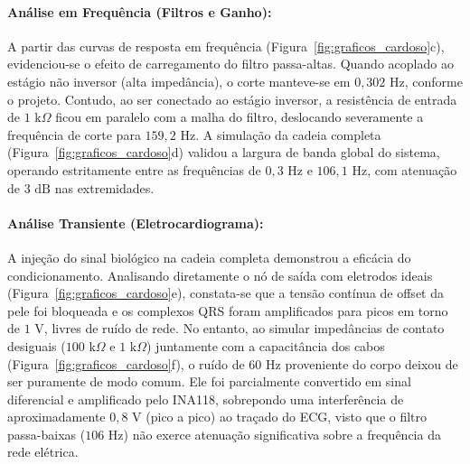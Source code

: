 \documentclass[11pt,a4paper]{article}
\begin{document}
\paragraph{Análise em Frequência (Filtros e Ganho):}
A partir das curvas de resposta em frequência (Figura~\ref{fig:graficos_cardoso}c), evidenciou-se o efeito de carregamento do filtro passa-altas. Quando acoplado ao estágio não inversor (alta impedância), o corte manteve-se em $0{,}302\text{ Hz}$, conforme o projeto. Contudo, ao ser conectado ao estágio inversor, a resistência de entrada de $1\text{ k}\Omega$ ficou em paralelo com a malha do filtro, deslocando severamente a frequência de corte para $159{,}2\text{ Hz}$. A simulação da cadeia completa (Figura~\ref{fig:graficos_cardoso}d) validou a largura de banda global do sistema, operando estritamente entre as frequências de $0{,}3\text{ Hz}$ e $106{,}1\text{ Hz}$, com atenuação de $3\text{ dB}$ nas extremidades.

\paragraph{Análise Transiente (Eletrocardiograma):}
A injeção do sinal biológico na cadeia completa demonstrou a eficácia do condicionamento. Analisando diretamente o nó de saída com eletrodos ideais (Figura~\ref{fig:graficos_cardoso}e), constata-se que a tensão contínua de offset da pele foi bloqueada e os complexos QRS foram amplificados para picos em torno de $1\text{ V}$, livres de ruído de rede. No entanto, ao simular impedâncias de contato desiguais ($100\text{ k}\Omega$ e $1\text{ k}\Omega$) juntamente com a capacitância dos cabos (Figura~\ref{fig:graficos_cardoso}f), o ruído de $60\text{ Hz}$ proveniente do corpo deixou de ser puramente de modo comum. Ele foi parcialmente convertido em sinal diferencial e amplificado pelo INA118, sobrepondo uma interferência de aproximadamente $0{,}8\text{ V}$ (pico a pico) ao traçado do ECG, visto que o filtro passa-baixas ($106\text{ Hz}$) não exerce atenuação significativa sobre a frequência da rede elétrica.
\end{document}
